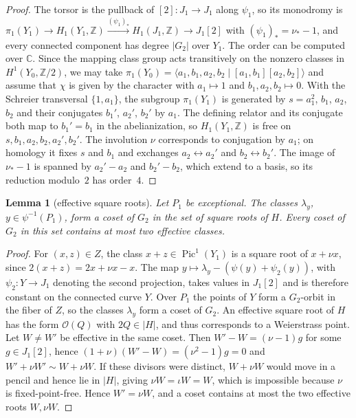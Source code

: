 \documentclass[11pt]{article}
\newtheorem{lemma}[theorem]{Lemma}
\theoremstyle{definition}
\theoremstyle{remark}
\DeclareMathOperator{\Pic}{Pic}
\newcommand{\OO}{\mathcal{O}}
\begin{document}
\begin{proof}
The torsor is the pullback of $[2]\colon J_1\to J_1$ along $\psi_1$, so its
monodromy is $\pi_1(Y_1)\to H_1(Y_1,\mathbb{Z})\xrightarrow{(\psi_1)_*}
H_1(J_1,\mathbb{Z})\to J_1[2]$ with $(\psi_1)_*=\nu_*-1$, and every connected
component has degree $|G_2|$ over $Y_1$. The order can be computed over
$\mathbb{C}$. Since the mapping class group acts transitively on the nonzero
classes in $H^1(Y_0,\mathbb{Z}/2)$, we may take
$\pi_1(Y_0)=\langle a_1,b_1,a_2,b_2\mid[a_1,b_1][a_2,b_2]\rangle$ and assume that
$\chi$ is given by the character with $a_1\mapsto 1$ and $b_1,a_2,b_2\mapsto 0$.
With the Schreier transversal $\{1,a_1\}$, the subgroup $\pi_1(Y_1)$ is generated
by $s=a_1^2$, $b_1$, $a_2$, $b_2$ and their conjugates $b_1'$, $a_2'$, $b_2'$ by
$a_1$. The defining relator and its conjugate both map to $b_1'=b_1$ in the
abelianization, so $H_1(Y_1,\mathbb{Z})$ is free on $s,b_1,a_2,b_2,a_2',b_2'$.
The involution $\nu$ corresponds to conjugation by $a_1$; on homology it fixes
$s$ and $b_1$ and exchanges $a_2\leftrightarrow a_2'$ and
$b_2\leftrightarrow b_2'$. The image of $\nu_*-1$ is spanned by $a_2'-a_2$ and
$b_2'-b_2$, which extend to a basis, so its reduction modulo~$2$ has order~$4$.
\end{proof}

\begin{lemma}[effective square roots]\label{lem:keff}
Let $P_1$ be exceptional. The classes $\lambda_y$, $y\in\psi^{-1}(P_1)$, form a
coset of $G_2$ in the set of square roots of $H$. Every coset of $G_2$ in this set
contains at most two effective classes.
\end{lemma}

\begin{proof}
For $(x,z)\in Z$, the class $x+z\in\Pic^1(Y_1)$ is a square root of $x+\nu x$,
since $2(x+z)=2x+\nu x-x$. The map $y\mapsto\lambda_y-(\psi(y)+\psi_2(y))$, with
$\psi_2\colon Y\to J_1$ denoting the second projection, takes values in $J_1[2]$
and is therefore constant on the connected curve $Y$. Over $P_1$ the points of $Y$
form a $G_2$-orbit in the fiber of $Z$, so the classes $\lambda_y$ form a coset of
$G_2$. An effective square root of $H$ has the form $\OO(Q)$ with $2Q\in|H|$, and
thus corresponds to a Weierstrass point. Let $W\ne W'$ be effective in the same
coset. Then $W'-W=(\nu-1)g$ for some $g\in J_1[2]$, hence
$(1+\nu)(W'-W)=(\nu^2-1)g=0$ and $W'+\nu W'\sim W+\nu W$. If these divisors were
distinct, $W+\nu W$ would move in a pencil and hence lie in $|H|$, giving
$\nu W=\iota W=W$, which is impossible because $\nu$ is fixed-point-free. Hence
$W'=\nu W$, and a coset contains at most the two effective roots $W,\nu W$.
\end{proof}
\end{document}
